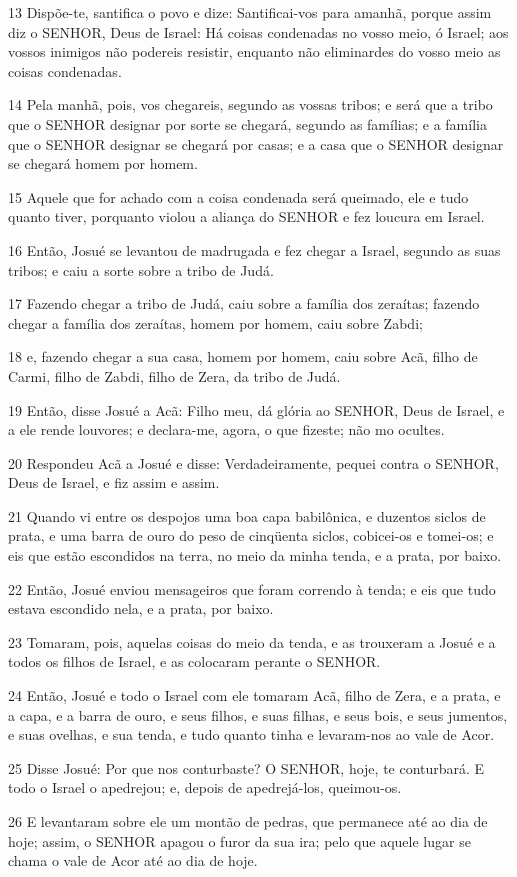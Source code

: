\par 13 Dispõe-te, santifica o povo e dize: Santificai-vos para amanhã, porque assim diz o SENHOR, Deus de Israel: Há coisas condenadas no vosso meio, ó Israel; aos vossos inimigos não podereis resistir, enquanto não eliminardes do vosso meio as coisas condenadas.
\par 14 Pela manhã, pois, vos chegareis, segundo as vossas tribos; e será que a tribo que o SENHOR designar por sorte se chegará, segundo as famílias; e a família que o SENHOR designar se chegará por casas; e a casa que o SENHOR designar se chegará homem por homem.
\par 15 Aquele que for achado com a coisa condenada será queimado, ele e tudo quanto tiver, porquanto violou a aliança do SENHOR e fez loucura em Israel.
\par 16 Então, Josué se levantou de madrugada e fez chegar a Israel, segundo as suas tribos; e caiu a sorte sobre a tribo de Judá.
\par 17 Fazendo chegar a tribo de Judá, caiu sobre a família dos zeraítas; fazendo chegar a família dos zeraítas, homem por homem, caiu sobre Zabdi;
\par 18 e, fazendo chegar a sua casa, homem por homem, caiu sobre Acã, filho de Carmi, filho de Zabdi, filho de Zera, da tribo de Judá.
\par 19 Então, disse Josué a Acã: Filho meu, dá glória ao SENHOR, Deus de Israel, e a ele rende louvores; e declara-me, agora, o que fizeste; não mo ocultes.
\par 20 Respondeu Acã a Josué e disse: Verdadeiramente, pequei contra o SENHOR, Deus de Israel, e fiz assim e assim.
\par 21 Quando vi entre os despojos uma boa capa babilônica, e duzentos siclos de prata, e uma barra de ouro do peso de cinqüenta siclos, cobicei-os e tomei-os; e eis que estão escondidos na terra, no meio da minha tenda, e a prata, por baixo.
\par 22 Então, Josué enviou mensageiros que foram correndo à tenda; e eis que tudo estava escondido nela, e a prata, por baixo.
\par 23 Tomaram, pois, aquelas coisas do meio da tenda, e as trouxeram a Josué e a todos os filhos de Israel, e as colocaram perante o SENHOR.
\par 24 Então, Josué e todo o Israel com ele tomaram Acã, filho de Zera, e a prata, e a capa, e a barra de ouro, e seus filhos, e suas filhas, e seus bois, e seus jumentos, e suas ovelhas, e sua tenda, e tudo quanto tinha e levaram-nos ao vale de Acor.
\par 25 Disse Josué: Por que nos conturbaste? O SENHOR, hoje, te conturbará. E todo o Israel o apedrejou; e, depois de apedrejá-los, queimou-os.
\par 26 E levantaram sobre ele um montão de pedras, que permanece até ao dia de hoje; assim, o SENHOR apagou o furor da sua ira; pelo que aquele lugar se chama o vale de Acor até ao dia de hoje.

